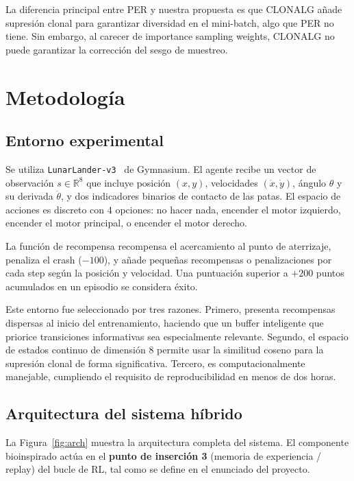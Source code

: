 \documentclass[12pt,a4paper]{article}
\begin{document}
La diferencia principal entre PER y nuestra propuesta es que CLONALG añade
supresión clonal para garantizar diversidad en el mini-batch, algo que PER
no tiene. Sin embargo, al carecer de importance sampling weights, CLONALG no
puede garantizar la corrección del sesgo de muestreo.
 
\section{Metodología}
\label{sec:metodologia}
 
\subsection{Entorno experimental}
 
Se utiliza \texttt{LunarLander-v3}~\cite{gymnasium} de Gymnasium. El agente
recibe un vector de observación $s \in \mathbb{R}^8$ que incluye posición
$(x, y)$, velocidades $(\dot{x}, \dot{y})$, ángulo $\theta$ y su derivada
$\dot{\theta}$, y dos indicadores binarios de contacto de las patas.
El espacio de acciones es discreto con 4 opciones: no hacer nada, encender
el motor izquierdo, encender el motor principal, o encender el motor derecho.
 
La función de recompensa recompensa el acercamiento al punto de aterrizaje,
penaliza el crash ($-100$), y añade pequeñas recompensas o penalizaciones por
cada step según la posición y velocidad. Una puntuación superior a $+200$
puntos acumulados en un episodio se considera éxito.
 
Este entorno fue seleccionado por tres razones. Primero, presenta recompensas
dispersas al inicio del entrenamiento, haciendo que un buffer inteligente que
priorice transiciones informativas sea especialmente relevante. Segundo, el
espacio de estados continuo de dimensión 8 permite usar la similitud coseno
para la supresión clonal de forma significativa. Tercero, es computacionalmente
manejable, cumpliendo el requisito de reproducibilidad en menos de dos horas.
 
\subsection{Arquitectura del sistema híbrido}
 
La Figura~\ref{fig:arch} muestra la arquitectura completa del sistema. El
componente bioinspirado actúa en el \textbf{punto de inserción 3} (memoria
de experiencia / replay) del bucle de RL, tal como se define en el enunciado
del proyecto.
 
\end{document}
